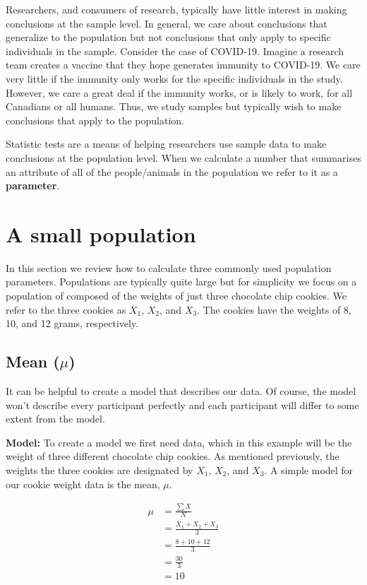 \documentclass[
]{krantz}
\begin{document}
Researchers, and consumers of research, typically have little interest in making conclusions at the sample level. In general, we care about conclusions that generalize to the population but not conclusions that only apply to specific individuals in the sample. Consider the case of COVID-19. Imagine a research team creates a vaccine that they hope generates immunity to COVID-19. We care very little if the immunity only works for the specific individuals in the study. However, we care a great deal if the immunity works, or is likely to work, for all Canadians or all humans. Thus, we study samples but typically wish to make conclusions that apply to the population.

Statistic tests are a means of helping researchers use sample data to make conclusions at the population level. When we calculate a number that summarises an attribute of all of the people/animals in the population we refer to it as a \textbf{parameter}.

\hypertarget{a-small-population}{%
\section{A small population}\label{a-small-population}}

In this section we review how to calculate three commonly used population parameters. Populations are typically quite large but for simplicity we focus on a population of composed of the weights of just three chocolate chip cookies. We refer to the three cookies as \(X_1\), \(X_2\), and \(X_3\). The cookies have the weights of 8, 10, and 12 grams, respectively.

\hypertarget{mean-mu}{%
\subsection{\texorpdfstring{Mean (\(\mu\))}{Mean (\textbackslash mu)}}\label{mean-mu}}

It can be helpful to create a model that describes our data. Of course, the model won't describe every participant perfectly and each participant will differ to some extent from the model.

\textbf{Model:} To create a model we first need data, which in this example will be the weight of three different chocolate chip cookies. As mentioned previously, the weights the three cookies are designated by \(X_1\), \(X_2\), and \(X_3\). A simple model for our cookie weight data is the mean, \(\mu\).

\[
\begin{aligned} 
\mu &= \frac{\sum{X}}{N} \\
&= \frac{X_1 + X_2 + X_3}{3}\\ 
&= \frac{8 + 10 + 12}{3}\\
&= \frac{30}{3}\\
&= 10\\
\end{aligned} 
\]
\end{document}
